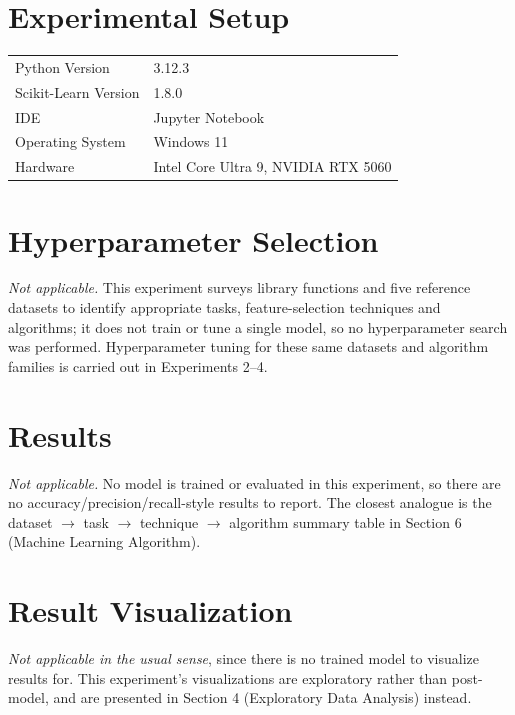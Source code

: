 \documentclass[12pt,a4paper]{article}
\begin{document}
\section{Experimental Setup}
\begin{tabular}{ll}
\toprule
Python Version & 3.12.3 \\
Scikit-Learn Version & 1.8.0 \\
IDE & Jupyter Notebook \\
Operating System & Windows 11 \\
Hardware & Intel Core Ultra 9, NVIDIA RTX 5060 \\
\bottomrule
\end{tabular}

\section{Hyperparameter Selection}
\textit{Not applicable.} This experiment surveys library functions and five reference
datasets to identify appropriate tasks, feature-selection techniques and algorithms; it
does not train or tune a single model, so no hyperparameter search was performed.
Hyperparameter tuning for these same datasets and algorithm families is carried out in
Experiments 2--4.

\section{Results}
\textit{Not applicable.} No model is trained or evaluated in this experiment, so there
are no accuracy/precision/recall-style results to report. The closest analogue is the
dataset $\to$ task $\to$ technique $\to$ algorithm summary table in Section 6 (Machine
Learning Algorithm).

\section{Result Visualization}
\textit{Not applicable in the usual sense}, since there is no trained model to visualize
results for. This experiment's visualizations are exploratory rather than post-model, and
are presented in Section 4 (Exploratory Data Analysis) instead.
\end{document}
